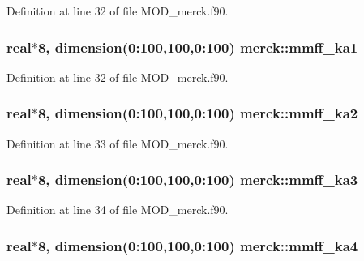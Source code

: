 Definition at line 32 of file M\-O\-D\-\_\-merck.\-f90.

\hypertarget{classmerck_a2cfea46a3328ecb5361185efa845173f}{
\subsubsection[{mmff\-\_\-ka1}]{\setlength{\rightskip}{0pt plus 5cm}real$\ast$8, dimension(0\-:100,100,0\-:100) merck\-::mmff\-\_\-ka1}}\label{classmerck_a2cfea46a3328ecb5361185efa845173f}


Definition at line 32 of file M\-O\-D\-\_\-merck.\-f90.

\hypertarget{classmerck_a2638860ef441294586104f06567d3d86}{
\subsubsection[{mmff\-\_\-ka2}]{\setlength{\rightskip}{0pt plus 5cm}real$\ast$8, dimension(0\-:100,100,0\-:100) merck\-::mmff\-\_\-ka2}}\label{classmerck_a2638860ef441294586104f06567d3d86}


Definition at line 33 of file M\-O\-D\-\_\-merck.\-f90.

\hypertarget{classmerck_ada5eeb62ef38993fe50aa8a6deef0efb}{
\subsubsection[{mmff\-\_\-ka3}]{\setlength{\rightskip}{0pt plus 5cm}real$\ast$8, dimension(0\-:100,100,0\-:100) merck\-::mmff\-\_\-ka3}}\label{classmerck_ada5eeb62ef38993fe50aa8a6deef0efb}


Definition at line 34 of file M\-O\-D\-\_\-merck.\-f90.

\hypertarget{classmerck_ae724496a18c156c3d42e779c5a9090a0}{
\subsubsection[{mmff\-\_\-ka4}]{\setlength{\rightskip}{0pt plus 5cm}real$\ast$8, dimension(0\-:100,100,0\-:100) merck\-::mmff\-\_\-ka4}}\label{classmerck_ae724496a18c156c3d42e779c5a9090a0}


